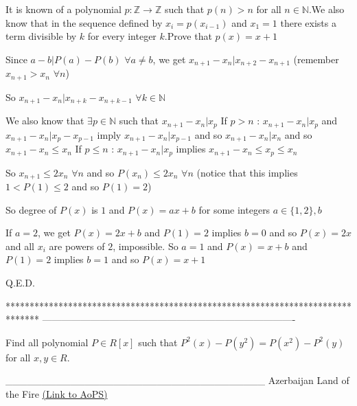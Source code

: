 \begin{solution}
	\begin{tcolorbox}It is known of a polynomial $p:\mathbb{Z}\longrightarrow\mathbb{Z}$ such that $p(n)> n$ for all $n\in\mathbb{N}$.We also know that in the sequence defined by $x_{i} =p(x_{i-1})$ and $x_1=1$ there exists a term divisible by $k$ for every integer $k$.Prove that $p(x)=x+1$\end{tcolorbox}
Since $a-b|P(a)-P(b)$ $\forall a\ne b$, we get $x_{n+1}-x_n|x_{n+2}-x_{n+1}$ (remember $x_{n+1}>x_n$ $\forall n$)

So $x_{n+1}-x_n|x_{n+k}-x_{n+k-1}$ $\forall k\in\mathbb N$

We also know that $\exists p\in\mathbb N$ such that $x_{n+1}-x_n|x_p$
If $p>n$ : $x_{n+1}-x_n|x_p$ and $x_{n+1}-x_n|x_{p}-x_{p-1}$ imply $x_{n+1}-x_n|x_{p-1}$  and so $x_{n+1}-x_n|x_n$ and so $x_{n+1}-x_n\le x_n$
If $p\le n$ : $x_{n+1}-x_n|x_p$ implies $x_{n+1}-x_n\le x_p\le x_n$

So $x_{n+1}\le 2x_n$ $\forall n$ and so $P(x_n)\le 2x_n$ $\forall n$ (notice that this implies $1<P(1)\le 2$ and so $P(1)=2$)

So degree of $P(x)$ is $1$ and $P(x)=ax+b$ for some integers $a\in\{1,2\},b$

If $a=2$, we get $P(x)=2x+b$ and $P(1)=2$ implies $b=0$ and so $P(x)=2x$ and all $x_i$ are powers of $2$, impossible.
So $a=1$ and $P(x)=x+b$ and $P(1)=2$ implies $b=1$ and so $P(x)=x+1$

Q.E.D.
\end{solution}
*******************************************************************************
-------------------------------------------------------------------------------

\begin{problem}
	Find  all  polynomial $P{\in}R[x]$ such that  $P^2(x)-P(y^2)=P(x^2)-P^2(y)$  for all $x,y{\in}R$.


____________________________________
Azerbaijan Land of the Fire 
	\flushright \href{https://artofproblemsolving.com/community/c6h531813}{(Link to AoPS)}
\end{problem}




